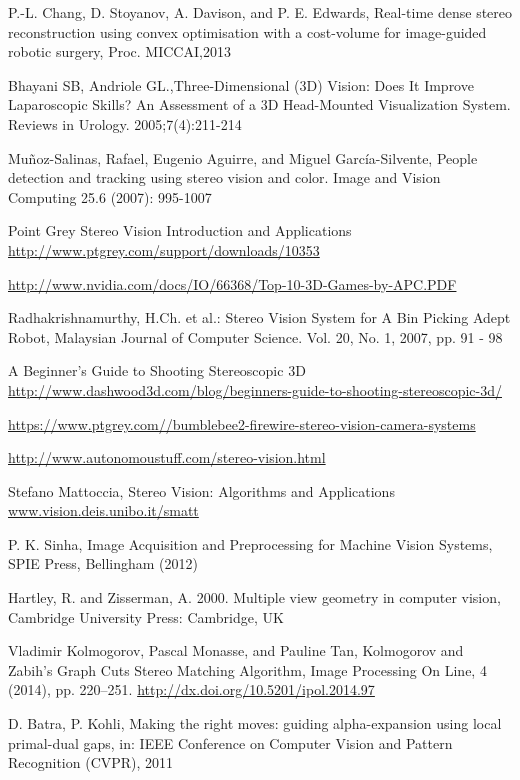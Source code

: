 
\begin{thebibliography}{99}

 P.-L. Chang, D. Stoyanov, A. Davison, and P. E. Edwards, Real-time
dense stereo reconstruction using convex optimisation with a cost-volume for image-guided robotic surgery, Proc. MICCAI,2013

Bhayani SB, Andriole GL.,Three-Dimensional (3D) Vision: Does It Improve Laparoscopic Skills? An Assessment of a 3D Head-Mounted Visualization System. Reviews in Urology. 2005;7(4):211-214


Muñoz-Salinas, Rafael, Eugenio Aguirre, and Miguel García-Silvente, People detection and tracking using stereo vision and color. Image and Vision Computing 25.6 (2007): 995-1007

 Point Grey Stereo Vision Introduction and Applications \url{http://www.ptgrey.com/support/downloads/10353}


 \url{http://www.nvidia.com/docs/IO/66368/Top-10-3D-Games-by-APC.PDF}


 Radhakrishnamurthy, H.Ch. et al.: Stereo Vision System for A Bin Picking Adept Robot, Malaysian Journal of Computer Science. Vol. 20, No. 1, 2007, pp. 91 - 98 

 A Beginner's Guide to Shooting Stereoscopic 3D \\ \url{http://www.dashwood3d.com/blog/beginners-guide-to-shooting-stereoscopic-3d/}

 \url{https://www.ptgrey.com//bumblebee2-firewire-stereo-vision-camera-systems}

\url{http://www.autonomoustuff.com/stereo-vision.html}

Stefano Mattoccia, Stereo Vision: Algorithms and Applications
\url{www.vision.deis.unibo.it/smatt}

P. K. Sinha, Image Acquisition and Preprocessing for Machine Vision Systems, SPIE Press, Bellingham (2012)

Hartley, R. and Zisserman, A. 2000. Multiple view geometry in computer vision, Cambridge University Press: Cambridge, UK


Vladimir Kolmogorov, Pascal Monasse, and Pauline Tan, Kolmogorov and Zabih’s Graph Cuts Stereo Matching Algorithm, Image Processing On Line, 4 (2014), pp. 220–251. \url{http://dx.doi.org/10.5201/ipol.2014.97}

D. Batra, P. Kohli, Making the right moves: guiding alpha-expansion using local primal-dual gaps, in: IEEE Conference on Computer Vision and Pattern Recognition (CVPR), 2011


\end{thebibliography}
